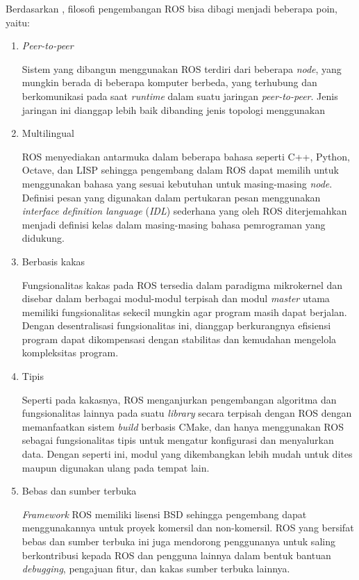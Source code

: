 Berdasarkan \citet{quigley2009}, filosofi pengembangan ROS bisa dibagi menjadi beberapa poin, yaitu:
\begin{enumerate}
    \item \textit{Peer-to-peer}

          Sistem yang dibangun menggunakan ROS terdiri dari beberapa \textit{node}, yang mungkin berada di beberapa komputer berbeda, yang terhubung dan berkomunikasi pada saat \textit{runtime} dalam suatu jaringan \textit{peer-to-peer}. Jenis jaringan ini dianggap lebih baik dibanding jenis topologi menggunakan

    \item Multilingual

          ROS menyediakan antarmuka dalam beberapa bahasa seperti C++, Python, Octave, dan LISP sehingga pengembang dalam ROS dapat memilih untuk menggunakan bahasa yang sesuai kebutuhan untuk masing-masing \textit{node}. Definisi pesan yang digunakan dalam pertukaran pesan menggunakan \textit{interface definition language} (\textit{IDL}) sederhana yang oleh ROS diterjemahkan menjadi definisi kelas dalam masing-masing bahasa pemrograman yang didukung.

    \item Berbasis kakas

          Fungsionalitas kakas pada ROS tersedia dalam paradigma mikrokernel dan disebar dalam berbagai modul-modul terpisah dan modul \textit{master} utama memiliki fungsionalitas sekecil mungkin agar program masih dapat berjalan. Dengan desentralisasi fungsionalitas ini, dianggap berkurangnya efisiensi program dapat dikompensasi dengan stabilitas dan kemudahan mengelola kompleksitas program.

    \item Tipis

          Seperti pada kakasnya, ROS menganjurkan pengembangan algoritma dan fungsionalitas lainnya pada suatu \textit{library} secara terpisah dengan ROS dengan memanfaatkan sistem \textit{build} berbasis CMake, dan hanya menggunakan ROS sebagai fungsionalitas tipis untuk mengatur konfigurasi dan menyalurkan data. Dengan seperti ini, modul yang dikembangkan lebih mudah untuk dites maupun digunakan ulang pada tempat lain.

    \item Bebas dan sumber terbuka

          \textit{Framework} ROS memiliki lisensi BSD sehingga pengembang dapat menggunakannya untuk proyek komersil dan non-komersil. ROS yang bersifat bebas dan sumber terbuka ini juga mendorong penggunanya untuk saling berkontribusi kepada ROS dan pengguna lainnya dalam bentuk bantuan \textit{debugging}, pengajuan fitur, dan kakas sumber terbuka lainnya.

\end{enumerate}

